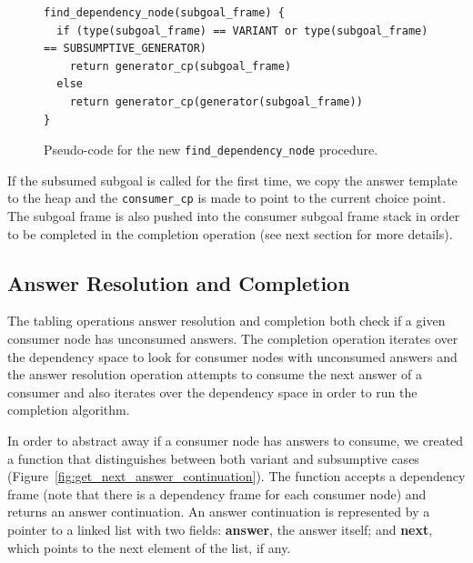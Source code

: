 \begin{figure}[ht]
\begin{Verbatim}
find_dependency_node(subgoal_frame) {
  if (type(subgoal_frame) == VARIANT or type(subgoal_frame) == SUBSUMPTIVE_GENERATOR)
    return generator_cp(subgoal_frame)
  else
    return generator_cp(generator(subgoal_frame))
}
\end{Verbatim}
\caption{Pseudo-code for the new \texttt{find\_dependency\_node} procedure.}
\label{fig:find_dependency_node}
\end{figure}

If the subsumed subgoal is called for the first time, we copy the answer template to the heap
and the \texttt{consumer\_cp} is made to point to the current choice point. The subgoal frame is
also pushed into the consumer subgoal frame stack in order to be completed in the completion operation
(see next section for more details).

\subsection{Answer Resolution and Completion}

The tabling operations answer resolution and completion both check if a
given consumer node has unconsumed answers. The completion operation
iterates over the dependency space to look for consumer nodes with unconsumed
answers and the answer resolution operation attempts to consume the next answer
of a consumer and also iterates over the dependency space in order to run the completion algorithm.

In order to abstract away if a consumer node has answers to consume,
we created a function that distinguishes between both variant and subsumptive cases
(Figure~\ref{fig:get_next_answer_continuation}).
The function accepts a dependency frame (note that there is a dependency frame for
each consumer node) and returns an answer continuation.
An answer continuation is represented by a pointer to a linked list with two fields:
\textbf{answer}, the answer itself; and \textbf{next}, which points to the next element of the list,
if any.

